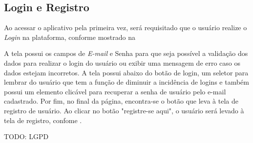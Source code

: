 \subsection{Login e Registro}

Ao acessar o aplicativo pela primeira vez, será requisitado que o usuário realize o \textit{Login} na plataforma, conforme mostrado na 


A tela possui os campos de \textit{E-mail} e Senha para que seja possível a validação dos dados para realizar o login do usuário ou exibir uma mensagem de erro caso os dados estejam incorretos. A tela possui abaixo do botão de login, um seletor para lembrar do usuário que tem a função de diminuir a incidência de logins e também possui um elemento clicável para recuperar a senha de usuário pelo e-mail cadastrado. Por fim, no final da página, encontra-se o botão que leva à tela de registro de usuário. Ao clicar no botão "registre-se aqui", o usuário será levado à tela de registro, confome .

TODO: LGPD

